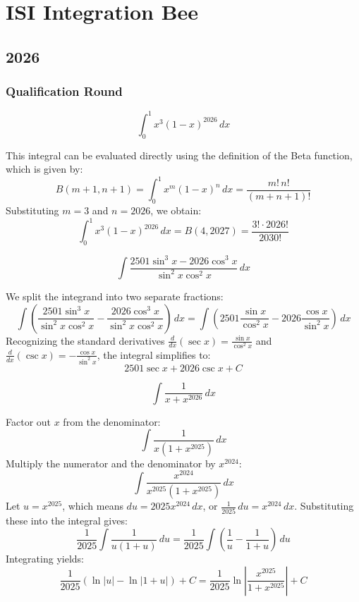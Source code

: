 \pagebreak
\section{ISI Integration Bee}
\subsection*{2026}
\subsubsection*{Qualification Round}

\begin{questions}

\question
\[ \int_{0}^{1} x^3 (1 - x)^{2026} \,dx \]
\begin{solution}
This integral can be evaluated directly using the definition of the Beta function, which is given by:
\[ B(m+1, n+1) = \int_{0}^{1} x^m (1-x)^n \,dx = \frac{m! \, n!}{(m+n+1)!} \]
Substituting $m = 3$ and $n = 2026$, we obtain:
\[ \int_{0}^{1} x^3 (1 - x)^{2026} \,dx = B(4, 2027) = \frac{3! \cdot 2026!}{2030!} \]
\end{solution}

\question
\[ \int \frac{2501 \sin^3 x - 2026 \cos^3 x}{\sin^2 x \cos^2 x} \,dx \]
\begin{solution}
We split the integrand into two separate fractions:
\[ \int \left( \frac{2501 \sin^3 x}{\sin^2 x \cos^2 x} - \frac{2026 \cos^3 x}{\sin^2 x \cos^2 x} \right) \,dx = \int \left( 2501 \frac{\sin x}{\cos^2 x} - 2026 \frac{\cos x}{\sin^2 x} \right) \,dx \]
Recognizing the standard derivatives $\frac{d}{dx}(\sec x) = \frac{\sin x}{\cos^2 x}$ and $\frac{d}{dx}(\csc x) = -\frac{\cos x}{\sin^2 x}$, the integral simplifies to:
\[ 2501 \sec x + 2026 \csc x + C \]
\end{solution}

\question
\[ \int \frac{1}{x + x^{2026}} \,dx \]
\begin{solution}
Factor out $x$ from the denominator:
\[ \int \frac{1}{x(1 + x^{2025})} \,dx \]
Multiply the numerator and the denominator by $x^{2024}$:
\[ \int \frac{x^{2024}}{x^{2025}(1 + x^{2025})} \,dx \]
Let $u = x^{2025}$, which means $du = 2025 x^{2024} \,dx$, or $\frac{1}{2025} \,du = x^{2024} \,dx$. Substituting these into the integral gives:
\[ \frac{1}{2025} \int \frac{1}{u(1+u)} \,du = \frac{1}{2025} \int \left( \frac{1}{u} - \frac{1}{1+u} \right) \,du \]
Integrating yields:
\[ \frac{1}{2025} \left( \ln|u| - \ln|1+u| \right) + C = \frac{1}{2025} \ln \left| \frac{x^{2025}}{1 + x^{2025}} \right| + C \]
\end{solution}


\end{questions}
